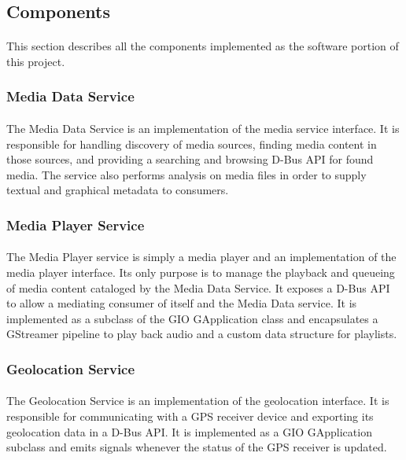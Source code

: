 \subsection{Components}

\paragraph{}
This section describes all the components implemented as the software portion of this project.

\subsubsection{Media Data Service}

\paragraph{}
The Media Data Service is an implementation of the media service interface.
It is responsible for handling discovery of media sources, finding media content in those sources, and providing a searching and browsing D-Bus API for found media.
The service also performs analysis on media files in order to supply textual and graphical metadata to consumers.

\subsubsection{Media Player Service}

\paragraph{}
The Media Player service is simply a media player and an implementation of the media player interface.
Its only purpose is to manage the playback and queueing of media content cataloged by the Media Data Service.
It exposes a D-Bus API to allow a mediating consumer of itself and the Media Data service.
It is implemented as a subclass of the GIO GApplication class and encapsulates a GStreamer pipeline to play back audio and a custom data structure for playlists.

\subsubsection{Geolocation Service}

\paragraph{}
The Geolocation Service is an implementation of the geolocation interface.
It is responsible for communicating with a GPS receiver device and exporting its geolocation data in a D-Bus API.
It is implemented as a GIO GApplication subclass and emits signals whenever the status of the GPS receiver is updated.

